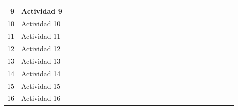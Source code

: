 \begin{landscape}
\begin{table}[htbp]
{\begin{tabular}{|r|l|r|r|r|r|r|r|r|r|r|r|r|r|r|r|r|r|r|r|r|r|r|r|r|r|}
			\midrule
			9     & Actividad 9 &       &       &       &       &       &       &       &       &       &       &       &       &       &       &       &       &       &       &       &       &       &       &       &  \\
			\midrule
			10    & Actividad 10 &       &       &       &       &       & \cellcolor[rgb]{ .557,  .663,  .859} & \cellcolor[rgb]{ .557,  .663,  .859} & \cellcolor[rgb]{ .557,  .663,  .859} & \cellcolor[rgb]{ .557,  .663,  .859} &       &       &       &       &       &       &       &       &       &       &       &       &       &       &  \\
			\midrule
			11    & Actividad 11 &       &       &       &       &       &       &       &       &       &       & \cellcolor[rgb]{ .557,  .663,  .859} & \cellcolor[rgb]{ .557,  .663,  .859} & \cellcolor[rgb]{ .557,  .663,  .859} & \cellcolor[rgb]{ .557,  .663,  .859} &       &       &       &       &       &       &       &       &       &  \\
			\midrule
			12    & Actividad 12 &       &       &       &       &       &       &       &       &       &       &       &       &       &       &       &       &       &       &       &       &       &       &       &  \\
			\midrule
			13    & Actividad 13 &       &       &       &       &       &       &       &       &       &       &       &       &       &       & \cellcolor[rgb]{ .557,  .663,  .859} & \cellcolor[rgb]{ .557,  .663,  .859} & \cellcolor[rgb]{ .557,  .663,  .859} & \cellcolor[rgb]{ .557,  .663,  .859} & \cellcolor[rgb]{ .557,  .663,  .859} &       &       &       &       &  \\
			\midrule
			14    & Actividad 14 &       &       &       &       &       &       &       &       &       &       &       &       &       &       &       &       &       &       &       & \cellcolor[rgb]{ .557,  .663,  .859} & \cellcolor[rgb]{ .557,  .663,  .859} & \cellcolor[rgb]{ .557,  .663,  .859} & \cellcolor[rgb]{ .557,  .663,  .859} &  \\
			\midrule
			15    & Actividad 15 &       &       &       &       &       &       &       &       &       &       &       &       &       &       &       &       &       &       &       &       &       & \cellcolor[rgb]{ .557,  .663,  .859} & \cellcolor[rgb]{ .557,  .663,  .859} & \cellcolor[rgb]{ .557,  .663,  .859} \\
			\midrule
			16    & Actividad 16 &       &       &       &       &       &       &       &       &       &       &       &       &       &       &       &       &       &       &       &       &       & \cellcolor[rgb]{ .557,  .663,  .859} & \cellcolor[rgb]{ .557,  .663,  .859} & \cellcolor[rgb]{ .557,  .663,  .859} \\

\end{tabular}}
\end{table}
\end{landscape}
